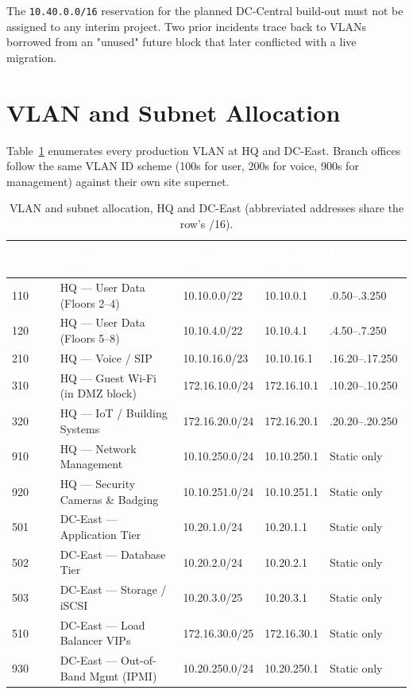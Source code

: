 \documentclass[11pt,a4paper]{report}
\newcommand{\thd}[1]{\textcolor{white}{\textbf{#1}}}
\begin{document}
\begin{warnbox}
The \texttt{10.40.0.0/16} reservation for the planned DC-Central build-out must not be
assigned to any interim project. Two prior incidents trace back to VLANs borrowed from an
"unused" future block that later conflicted with a live migration.
\end{warnbox}

\section{VLAN and Subnet Allocation}
\label{sec:vlans}
Table~\ref{tab:vlans} enumerates every production VLAN at HQ and DC-East. Branch offices
follow the same VLAN ID scheme (100s for user, 200s for voice, 900s for management) against
their own site supernet.

\begin{table}[H]
\centering
{}
\begin{tabularx}{\linewidth}{@{}l X l l l@{}}
\toprule
\rowcolor{navy}
\thd{VLAN} & \thd{Name} & \thd{Subnet} & \thd{Gateway} & \thd{DHCP Range} \\
\midrule
110 & HQ --- User Data (Floors 2--4)   & 10.10.0.0/22   & 10.10.0.1   & .0.50--.3.250 \\
120 & HQ --- User Data (Floors 5--8)   & 10.10.4.0/22   & 10.10.4.1   & .4.50--.7.250 \\
210 & HQ --- Voice / SIP               & 10.10.16.0/23  & 10.10.16.1  & .16.20--.17.250 \\
310 & HQ --- Guest Wi-Fi (in DMZ block)& 172.16.10.0/24 & 172.16.10.1 & .10.20--.10.250 \\
320 & HQ --- IoT / Building Systems    & 172.16.20.0/24 & 172.16.20.1 & .20.20--.20.250 \\
910 & HQ --- Network Management        & 10.10.250.0/24 & 10.10.250.1 & Static only \\
920 & HQ --- Security Cameras \& Badging & 10.10.251.0/24 & 10.10.251.1 & Static only \\
501 & DC-East --- Application Tier      & 10.20.1.0/24   & 10.20.1.1   & Static only \\
502 & DC-East --- Database Tier         & 10.20.2.0/24   & 10.20.2.1   & Static only \\
503 & DC-East --- Storage / iSCSI       & 10.20.3.0/25   & 10.20.3.1   & Static only \\
510 & DC-East --- Load Balancer VIPs    & 172.16.30.0/25 & 172.16.30.1 & Static only \\
930 & DC-East --- Out-of-Band Mgmt (IPMI) & 10.20.250.0/24 & 10.20.250.1 & Static only \\
\bottomrule
\end{tabularx}
\caption{VLAN and subnet allocation, HQ and DC-East (abbreviated addresses share the row's /16).}
\label{tab:vlans}
\end{table}
\end{document}
